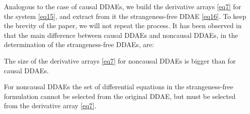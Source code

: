 \documentclass[final,reqno]{siamltex}
\renewenvironment{enumerate}[1]{\begin{compactenum}#1}{\end{compactenum}}
\begin{document}
Analogous to the case of causal DDAEs, we build the derivative arrays \eqref{eq7} for the system \eqref{eq15}, and extract from it the 
strangeness-free DDAE \eqref{eq16}. To keep the brevity of the paper, we will not repeat the process.
It has been observed in \cite{HaM14} that the main difference between causal DDAEs and noncausal DDAEs, in the determination of the 
strangeness-free DDAEs, are:
\begin{enumerate}
 \item[i)] The size of the derivative arrays \eqref{eq7} for noncausal DDAEs is bigger than for causal DDAEs.
 \item[ii)] For noncausal DDAEs the set of differential equations in the strangeness-free formulation cannot be selected from the original DDAE, but must be 
 selected from the derivative array \eqref{eq7}.
\end{enumerate}
\end{document}
